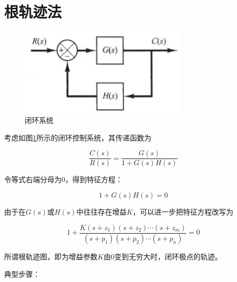 \section{根轨迹法}

\begin{figure}[!ht]
    \centering
    \includegraphics[width=8cm]{figures/20.png}
    \caption{闭环系统}
    \label{20}
\end{figure}

考虑如图\ref{20}所示的闭环控制系统，其传递函数为

\begin{equation*}
    \frac{C(s)}{R(s)}=\frac{G(s)}{1+G(s) H(s)}
\end{equation*}

令等式右端分母为$0$，得到特征方程：

\begin{equation*}
    1+G(s) H(s)=0
\end{equation*}

由于在$G(s)$或$H(s)$中往往存在增益$K$，可以进一步把特征方程改写为

\begin{equation*}
    1+\frac{K\left(s+z_{1}\right)\left(s+z_{2}\right) \cdots\left(s+z_{m}\right)}{\left(s+p_{1}\right)\left(s+p_{2}\right) \cdots\left(s+p_{n}\right)}=0
\end{equation*}

所谓根轨迹图，即为增益参数$K$由0变到无穷大时，闭环极点的轨迹。

典型步骤：

